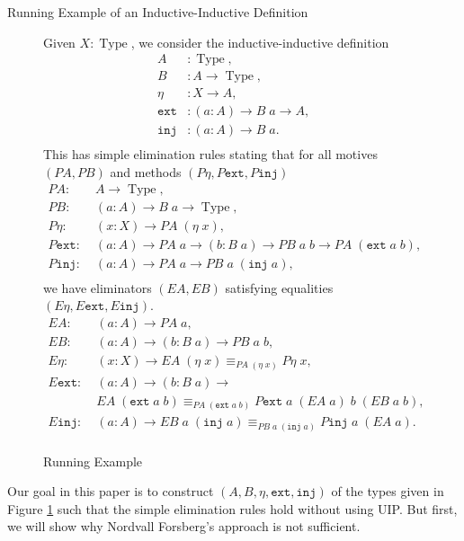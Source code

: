 \documentclass[runningheads]{llncs}
\DeclareMathOperator{\USet}{Type}
\newcommand{\IdA}[3]{{#1}\equiv_{#3}{#2}}
\newcommand{\join}{\texttt{ext}}
\newcommand{\inj}{\texttt{inj}}
\newcommand{\PA}{\mathit{PA}}
\newcommand{\PB}{\mathit{PB}}
\newcommand{\EA}{\mathit{EA}}
\newcommand{\EB}{\mathit{EB}}
\def\Forsberg/{Nordvall Forsberg}
\begin{document}
\begin{subsection}{\label{II-examples}Running Example of an Inductive-Inductive Definition}
\begin{figure}[htpb]
    \begin{flushleft}
        Given $X : \USet$, we consider the inductive-inductive definition\vspace{-.1in}
        \begin{align*}
        A &: \USet,\\
        B &: A \to \USet,\\
        \eta &: X \to A,\\
        \join &: (a : A) \to B\;a \to A,\\
        \inj &: (a : A) \to B\;a.\\[-.3in]
        \end{align*}
        This has simple elimination rules stating that for all motives $(\PA, \PB)$ and methods $(P\eta, P\join, P\inj)$\vspace{-.1in}
        \begin{align*}
        \PA :&\; A \to \USet,\\
        \PB :&\; (a : A) \to B\;a\to \USet,\\
        P\eta :&\; (x : X) \to \PA\;(\eta\;x),\\
        P\join :&\; (a : A) \to \PA\;a\to (b : B\;a) \to \PB\;a\;b \to \PA\;(\join\;a\;b),\\
        P\inj :&\; (a : A) \to \PA\;a\to \PB\;a\;(\inj\;a),\\[-.3in]
        \end{align*}
        we have eliminators $(\EA, \EB)$ satisfying equalities $(E\eta, E\join, E\inj)$.\vspace{-.1in}
        \begin{align*}
        \EA :&\; (a : A) \to \PA\;a,\\
        \EB :&\; (a : A) \to (b : B\;a) \to \PB\;a\;b,\\
        E\eta :&\; (x : X) \to \IdA{\EA\;(\eta\;x)}{P\eta\;x}{\PA\;(\eta\;x)},\\
        E\join :&\; (a : A) \to (b : B\;a) \to\\&\; \IdA{\EA\;(\join\;a\;b)}{P\join\;a\;(\EA\;a)\;b\;(\EB\;a\;b)}{\PA\;(\join\;a\;b)},\\
        E\inj :&\; (a : A) \to \IdA{\EB\;a\;(\inj\;a)}{P\inj\;a\;(\EA\;a)}{\PB\;a\;(\inj\;a)}.\\[-.3in]
        \end{align*}
    \end{flushleft}
    
    \caption{\label{example-definition}Running Example}
\end{figure}

Our goal in this paper is to construct $(A,B,\eta,\join,\inj)$ of the types given in Figure \ref{example-definition} such that the simple elimination rules hold without using UIP. But first, we will show why \Forsberg/'s approach is not sufficient.



\end{subsection}
\end{document}
